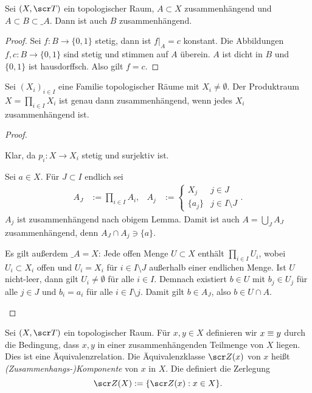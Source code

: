 \begin{lem}
	Sei $(X, \scr T)$ ein topologischer Raum, $A \subset X$ zusammenhängend und $A \subset B \subset \_A$.
	Dann ist auch $B$ zusammenhängend.
	\begin{proof}
		Sei $f: B \to \{0,1\}$ stetig, dann ist $f|_A = c$ konstant.
		Die Abbildungen $f, c: B \to \{0,1\}$ sind stetig und stimmen auf $A$ überein.
		$A$ ist dicht in $B$ und $\{0,1\}$ ist hausdorffsch.
		Also gilt $f=c$.
	\end{proof}
\end{lem}

\begin{st}
	Sei $(X_i)_{i\in I}$ eine Familie topologischer Räume mit $X_i \neq \emptyset$.
	Der Produktraum $X = \prod_{i\in I} X_i$ ist genau dann zusammenhängend, wenn jedes $X_i$ zusammenhängend ist.
	\begin{proof}
		\begin{segnb}[„$\implies$“]
			Klar, da $p_i: X \to X_i$ stetig und surjektiv ist.
		\end{segnb}
		\begin{segnb}[„$\implies$“]
			Sei $a \in X$.
			Für $J \subset I$ endlich sei
			\begin{align*}
				A_J &:= \prod_{i\in I} A_i, &
				A_j &:= \begin{cases}
					X_j & j \in J \\
					\{a_j\} & j \in I \setminus J
				\end{cases}.
			\end{align*}
			$A_j$ ist zusammenhängend nach obigem Lemma.
			Damit ist auch $A = \bigcup_{J} A_J$ zusammenhängend, denn $A_J \cap A_j \ni \{a\}$.

			Es gilt außerdem $\_A = X$:
			Jede offen Menge $U \subset X$ enthält $\prod_{i \in I} U_i$, wobei $U_i \subset X_i$ offen und $U_i = X_i$ für $i \in I \setminus J$ außerhalb einer endlichen Menge.
			Ist $U$ nicht-leer, dann gilt $U_i \neq \emptyset$ für alle $i \in I$.
			Demnach existiert $b \in U$ mit $b_j \in U_j$ für alle $j \in J$ und $b_i = a_i$ für alle $i \in I \setminus j$.
			Damit gilt $b \in A_J$, also $b \in U \cap A$.
		\end{segnb}
	\end{proof}
\end{st}

\begin{df}
	Sei $(X, \scr T)$ ein topologischer Raum.
	Für $x,y \in X$ definieren wir $x \equiv y$ durch die Bedingung, dass $x,y$ in einer zusammenhängenden Teilmenge von $X$ liegen.
	Dies ist eine Äquivalenzrelation.
	Die Äquivalenzklasse $\scr Z(x)$ von $x$ heißt \emph{(Zusammenhangs-)Komponente} von $x$ in $X$.
	Die definiert die Zerlegung
	\[
		\scr Z(X) := \{ \scr Z(x) : x \in X \}.
	\]
\end{df}

